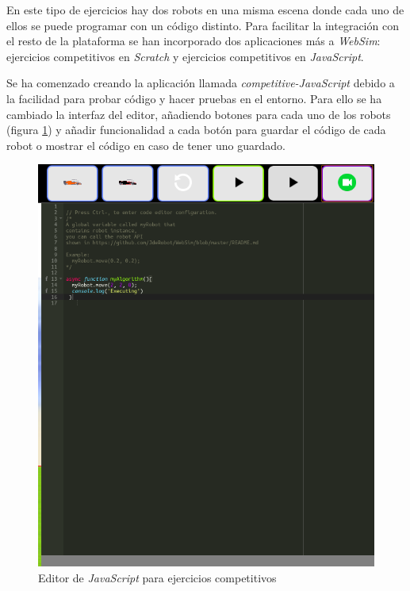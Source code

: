 En este tipo de ejercicios hay dos robots en una misma escena donde cada uno de ellos se puede programar con un código distinto. Para facilitar la integración con el resto de la plataforma se han incorporado dos aplicaciones más a \textit{WebSim}: ejercicios competitivos en \textit{Scratch} y ejercicios competitivos en \textit{JavaScript}. 


Se ha comenzado creando la aplicación llamada \textit{competitive-JavaScript} debido a la facilidad para probar código y hacer pruebas en el entorno. Para ello se ha cambiado la interfaz del editor, añadiendo botones para cada uno de los robots (figura \ref{fig:javascript_competitivo}) y añadir funcionalidad a cada botón para guardar el código de cada robot o mostrar el código en caso de tener uno guardado.

    \begin{figure}[h]
        \centering            \includegraphics[scale=0.30]{img/competitiveEditorJavascript.png}
        \caption{Editor de \textit{JavaScript} para ejercicios competitivos}
        \label{fig:javascript_competitivo}
    \end{figure}


